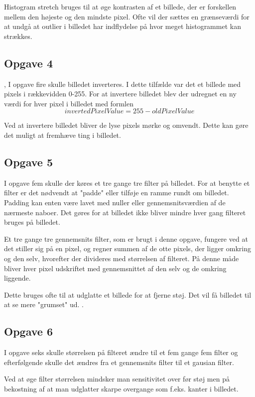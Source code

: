 \documentclass{article}
\begin{document}
Histogram stretch bruges til at øge kontrasten af et billede, der er forskellen mellem den højeste og den mindste pixel. Ofte vil der sættes en grænseværdi for at undgå at outlier i billedet har indflydelse på hvor meget histogrammet kan strækkes. 

\subsection{Opgave 4},
I opgave fire skulle billedet inverteres. I dette tilfælde var det et billede med pixels i rækkevidden 0-255. For at invertere billedet blev der udregnet en ny værdi for hver pixel i billedet med formlen $$ invertedPixelValue = 255 - oldPixelValue $$ \newline 

Ved at invertere billedet bliver de lyse pixels mørke og omvendt. Dette kan gøre det muligt at fremhæve ting i billedet.   

\subsection{Opgave 5}
I opgave fem skulle der køres et tre gange tre filter på billedet. For at benytte et filter er det nødvendt at "padde" eller tilføje en ramme rundt om billedet. Padding kan enten være lavet med nuller eller gennemsnitsværdien af de nærmeste naboer. Det gøres for at billedet ikke bliver mindre hver gang filteret bruges på billedet. \newline 

Et tre gange tre gennemsnits filter, som er brugt i denne opgave, fungere ved at det stiller sig på en pixel, og regner summen af de otte pixels, der ligger omkring og den selv, hvorefter der divideres med størrelsen af filteret. På denne måde bliver hver pixel udskriftet med gennemsnittet af den selv og de omkring liggende.  

Dette bruges ofte til at udglatte et billede for at fjerne støj. Det vil få billedet til at se mere "grumset" ud. .

\subsection{Opgave 6}
I opgave seks skulle størrelsen på filteret ændre til et fem gange fem filter og efterfølgende skulle det ændres fra et gennemsnits filter til et gausian filter. \newline 

Ved at øge filter størrelsen mindsker man sensitivitet over før støj men på bekostning af at man udglatter skarpe overgange som f.eks. kanter i billedet. \newline 
\end{document}
